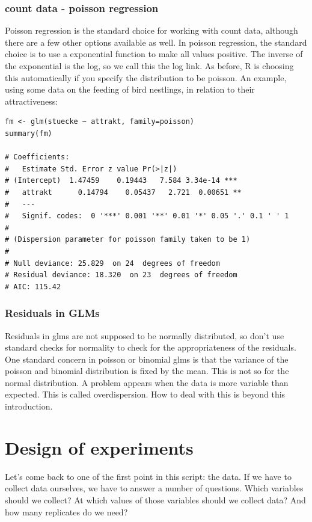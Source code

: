 \documentclass[a4paper,twoside]{tufte-book} %
\begin{document}
\subsection{count data - poisson regression}

Poisson regression is the standard choice for working with count data, although there are a few other options available as well. In poisson regression, the standard choice is to use a exponential function to make all values positive. The inverse of the exponential is the log, so we call this the log link. As before, R is choosing this automatically if you specify the distribution to be poisson. An example, using some data on the feeding of bird nestlings, in relation to their attractiveness:

\begin{lstlisting}
fm <- glm(stuecke ~ attrakt, family=poisson)
summary(fm)

# Coefficients:
#   Estimate Std. Error z value Pr(>|z|)    
# (Intercept)  1.47459    0.19443   7.584 3.34e-14 ***
#   attrakt      0.14794    0.05437   2.721  0.00651 ** 
#   ---
#   Signif. codes:  0 '***' 0.001 '**' 0.01 '*' 0.05 '.' 0.1 ' ' 1
# 
# (Dispersion parameter for poisson family taken to be 1)
# 
# Null deviance: 25.829  on 24  degrees of freedom
# Residual deviance: 18.320  on 23  degrees of freedom
# AIC: 115.42
\end{lstlisting}

\subsection{Residuals in GLMs}

Residuals in glms are not supposed to be normally distributed, so don't use standard checks for normality to check for the appropriateness of the residuals. One standard concern in poisson or binomial glms is that the variance of the poisson and binomial distribution is fixed by the mean. This is not so for the normal distribution. A problem appears when the data is more variable than expected. This is called overdispersion. How to deal with this is beyond this introduction. 


\chapter{Design of experiments}

Let's come back to one of the first point in this script: the data. If we have to collect data ourselves, we have to answer a number of questions. Which variables should we collect? At which values of those variables should we collect data? And how many replicates do we need?
\end{document}
